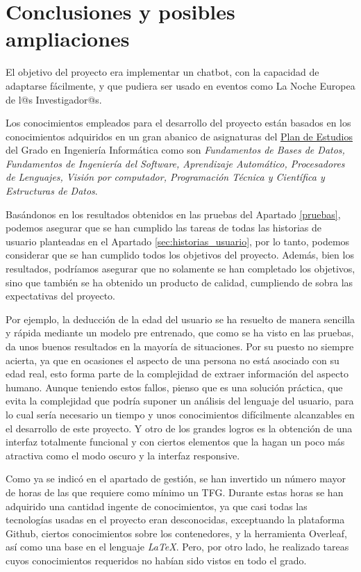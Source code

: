 \chapter{Conclusiones y posibles ampliaciones}

El objetivo del proyecto era implementar un chatbot, con la capacidad de adaptarse fácilmente, y que pudiera ser usado en eventos como La Noche Europea de l@s Investigador@s.

Los conocimientos empleados para el desarrollo del proyecto están basados en los conocimientos adquiridos en un gran abanico de asignaturas del \href{https://grados.ugr.es/informatica/pages/infoacademica/estudios}{Plan de Estudios} del Grado en Ingeniería Informática como son \textit{Fundamentos de Bases de Datos, Fundamentos de Ingeniería del Software, Aprendizaje Automático, Procesadores de Lenguajes, Visión por computador, Programación Técnica y Científica y Estructuras de Datos}.

Basándonos en los resultados obtenidos en las pruebas del Apartado \ref{pruebas}, podemos asegurar que se han cumplido las tareas de todas las historias de usuario planteadas en el Apartado \ref{sec:historias_usuario}, por lo tanto, podemos considerar que se han cumplido todos los objetivos del proyecto. Además, bien los resultados, podríamos asegurar que no solamente se han completado los objetivos, sino que también se ha obtenido un producto de calidad, cumpliendo de sobra las expectativas del proyecto.

Por ejemplo, la deducción de la edad del usuario se ha resuelto de manera sencilla y rápida mediante un modelo pre entrenado, que como se ha visto en las pruebas, da unos buenos resultados en la mayoría de situaciones. Por su puesto no siempre acierta, ya que en ocasiones el aspecto de una persona no está asociado con su edad real, esto forma parte de la complejidad de extraer información del aspecto humano. Aunque teniendo estos fallos, pienso que es una solución práctica, que evita la complejidad que podría suponer un análisis del lenguaje del usuario, para lo cual sería necesario un tiempo y unos conocimientos difícilmente alcanzables en el desarrollo de este proyecto. Y otro de los grandes logros es la obtención de una interfaz totalmente funcional y con ciertos elementos que la hagan un poco más atractiva como el modo oscuro y la interfaz responsive.

Como ya se indicó en el apartado de gestión, se han invertido un número mayor de horas de las que requiere como mínimo un TFG. Durante estas horas se han adquirido una cantidad ingente de conocimientos, ya que casi todas las tecnologías usadas en el proyecto eran desconocidas, exceptuando la plataforma Github, ciertos conocimientos sobre los contenedores, y la herramienta Overleaf, así como una base en el lenguaje \textit{LaTeX}. Pero, por otro lado, he realizado tareas cuyos conocimientos requeridos no habían sido vistos en todo el grado.

